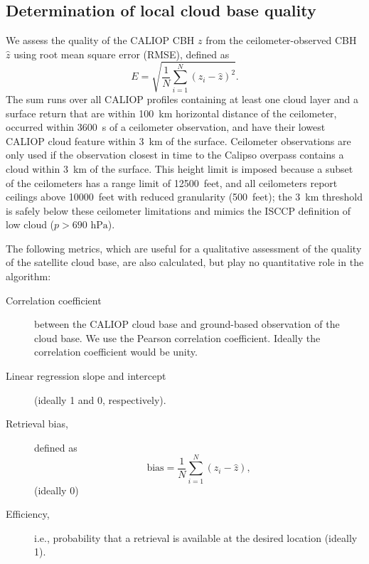 \documentclass[essd,manuscript]{copernicus}\usepackage[]{graphicx}\usepackage[]{color}
\begin{document}
\subsection{Determination of local cloud base quality}
\label{sec:algorithm:qual}
We assess the quality of the CALIOP CBH $z$ from the
ceilometer-observed CBH $\hat{z}$ using root mean square error
(RMSE), defined as
\begin{equation}
  \label{eq:rmse}
  E = \sqrt{\frac{1}{N}\sum\limits_{i = 1}^{N}\left(z_i - \hat{z}\right)^2}.
\end{equation}
The sum runs over all CALIOP profiles containing at least one cloud layer and a
surface return that are within 100~km horizontal distance of the ceilometer,
occurred within 3600~s of a ceilometer observation, and have their lowest CALIOP
cloud feature within 3~km of the surface.  Ceilometer observations are only used
if the observation closest in time to the Calipso overpass contains a cloud
within 3~km of the surface.  This height limit is imposed because a subset of
the ceilometers has a range limit of 12500~feet, and all ceilometers report
ceilings above 10000~feet with reduced granularity (500~feet); the 3~km
threshold is safely below these ceilometer limitations and mimics the ISCCP
definition of low cloud ($p > 690\text{ hPa}$).

The following metrics, which are useful for a qualitative assessment of the
quality of the satellite cloud base, are also calculated, but play no
quantitative role in the algorithm:
\begin{description}
\item[Correlation coefficient] between the CALIOP cloud base and ground-based
  observation of the cloud base.  We use the Pearson correlation coefficient.
  Ideally the correlation coefficient would be unity.  
\item[Linear regression slope and intercept] (ideally 1 and 0, respectively).  
\item[Retrieval bias,] defined as
  \begin{equation}
    \label{eq:bias}
    \mbox{bias} = \frac{1}{N}\sum\limits_{i = 1}^{N}\left(z_i - \hat{z}\right),
  \end{equation}(ideally 0)
\item[Efficiency,] i.e., probability that a retrieval is available at the
  desired location (ideally 1).
\end{description}
\end{document}
